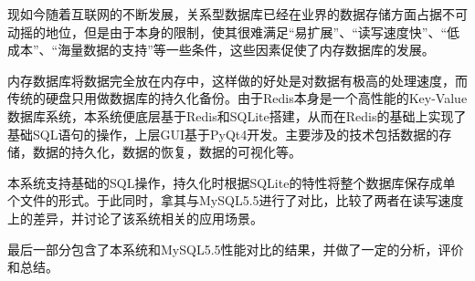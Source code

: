\begin{abstractc}
现如今随着互联网的不断发展，关系型数据库已经在业界的数据存储方面占据不可动摇的地位，但是由于本身的限制，使其很难满足“易扩展”、“读写速度快”、“低成本”、“海量数据的支持”等一些条件，这些因素促使了内存数据库的发展。

内存数据库将数据完全放在内存中，这样做的好处是对数据有极高的处理速度，而传统的硬盘只用做数据库的持久化备份。由于Redis本身是一个高性能的Key-Value数据库系统，本系统便底层基于Redis和SQLite搭建，从而在Redis的基础上实现了基础SQL语句的操作，上层GUI基于PyQt4开发。主要涉及的技术包括数据的存储，数据的持久化，数据的恢复，数据的可视化等。

本系统支持基础的SQL操作，持久化时根据SQLite的特性将整个数据库保存成单个文件的形式。于此同时，拿其与MySQL5.5进行了对比，比较了两者在读写速度上的差异，并讨论了该系统相关的应用场景。

最后一部分包含了本系统和MySQL5.5性能对比的结果，并做了一定的分析，评价和总结。


\end{abstractc}
